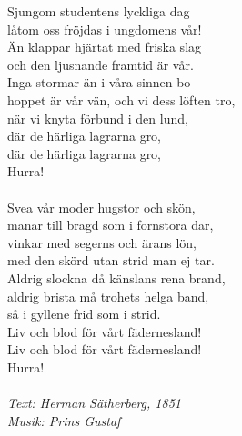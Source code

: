 \vspace{10pt}
Sjungom studentens lyckliga dag\\
låtom oss fröjdas i ungdomens vår!\\
Än klappar hjärtat med friska slag\\
och den ljusnande framtid är vår.\\
Inga stormar än i våra sinnen bo\\
hoppet är vår vän, och vi dess löften tro,\\
när vi knyta förbund i den lund,\\
där de härliga lagrarna gro,\\
där de härliga lagrarna gro,\\
Hurra!\\
\\
Svea vår moder hugstor och skön,\\
manar till bragd som i fornstora dar,\\
vinkar med segerns och ärans lön,\\
med den skörd utan strid man ej tar.\\
Aldrig slockna då känslans rena brand,\\
aldrig brista må trohets helga band,\\
så i gyllene frid som i strid.\\
Liv och blod för vårt fädernesland!\\
Liv och blod för vårt fädernesland!\\
Hurra!\\
\\
{\footnotesize\textit{Text: Herman Sätherberg, 1851\\
Musik: Prins Gustaf}}
\clearpage
